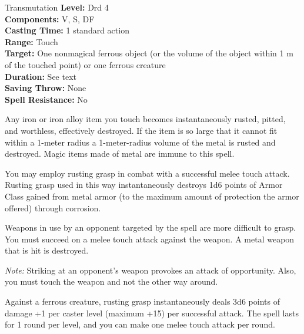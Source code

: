 {Transmutation}
{
	\textbf{Level:}
	Drd 4\\
	\textbf{Components:}
	V, S, DF\\
	\textbf{Casting Time:}
	1 standard action\\
	\textbf{Range:}
	Touch\\
	\textbf{Target:}
	One nonmagical ferrous object (or the volume of the object within 1 m of the touched point) or one ferrous creature\\
	\textbf{Duration:}
	See text\\
	\textbf{Saving Throw:}
	None\\
	\textbf{Spell Resistance:}
	No\\
}
{
	Any iron or iron alloy item you touch becomes instantaneously rusted, pitted, and worthless, effectively destroyed. If the item is so large that it cannot fit within a 1-meter radius a 1-meter-radius volume of the metal is rusted and destroyed. Magic items made of metal are immune to this spell.

	You may employ rusting grasp in combat with a successful melee touch attack. Rusting grasp used in this way instantaneously destroys 1d6 points of Armor Class gained from metal armor (to the maximum amount of protection the armor offered) through corrosion.

	Weapons in use by an opponent targeted by the spell are more difficult to grasp. You must succeed on a melee touch attack against the weapon. A metal weapon that is hit is destroyed.

	\textit{Note:} Striking at an opponent's weapon provokes an attack of opportunity. Also, you must touch the weapon and not the other way around.

	Against a ferrous creature, rusting grasp instantaneously deals 3d6 points of damage +1 per caster level (maximum +15) per successful attack. The spell lasts for 1 round per level, and you can make one melee touch attack per round.

}
